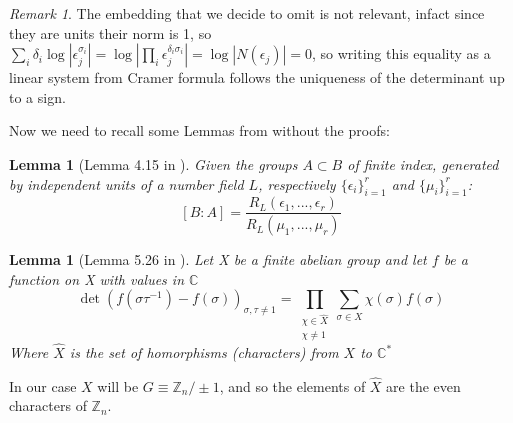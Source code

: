 \documentclass[]{article}
\theoremstyle{plain}
\newtheorem{lem}[teo]{Lemma}
\theoremstyle{remark}
\newtheorem{rem}{Remark}
\theoremstyle{definition}
\newcommand{\Z}{\mathbb{Z}}
\newcommand{\C}{\mathbb{C}}
\begin{document}
	\begin{rem} \label{rem:reg}
		The embedding that we decide to omit is not relevant, infact since they are units their norm is 1, so $ \sum_i  \delta_i \log | \epsilon_j ^{\sigma_i}| =\log | \prod_i \epsilon_j^{\delta_i \sigma_i }|=\log |N(\epsilon_j)| = 0$, so writing this equality as a linear system from Cramer formula follows the uniqueness of the determinant up to a sign. %
	\end{rem}

	Now we need to recall some Lemmas from \cite{CF} without the proofs: 
	
	\begin{lem}[Lemma 4.15 in \cite{CF}]
		\label{lem:index_reg}
		Given the groups $ A \subset B $ of finite index, generated by independent units of a number field $ L $, respectively $ \{\epsilon_i\}_{i=1}^r $ and $ \{\mu_i\}_{i=1}^r $:
		\begin{equation} \label{eq:index_reg}
			[B:A]= \frac{R_L(\epsilon_1 , ... , \epsilon_r) }{R_L(\mu_1 , ... , \mu_r) }
		\end{equation}
	\end{lem}

	\begin{lem}[Lemma 5.26 in \cite{CF}] 
		\label{lem:det}
		Let \textit{X} be a finite abelian group and let $ f $ be a function on \textit{X} with values in $ \C $
		\begin{equation}\label{eq:det}
			\det (f (\sigma \tau ^{-1}) - f (\sigma))_{\sigma , \tau \neq 1 } = \prod_{\substack{\chi \in \hat{X} \\ \chi \neq 1}}  \sum_{\sigma \in X} \chi(\sigma)f(\sigma)
		\end{equation}
		Where $ \hat{X} $ is the set of homorphisms (characters) from $ X $ to $ \C ^\ast $
	\end{lem}
	In our case $ X $  will be $ G \equiv \Z_n / \pm 1 $, and so the elements of $ \hat{X} $ are the even characters of $ \Z_n $. 
	
\end{document}
